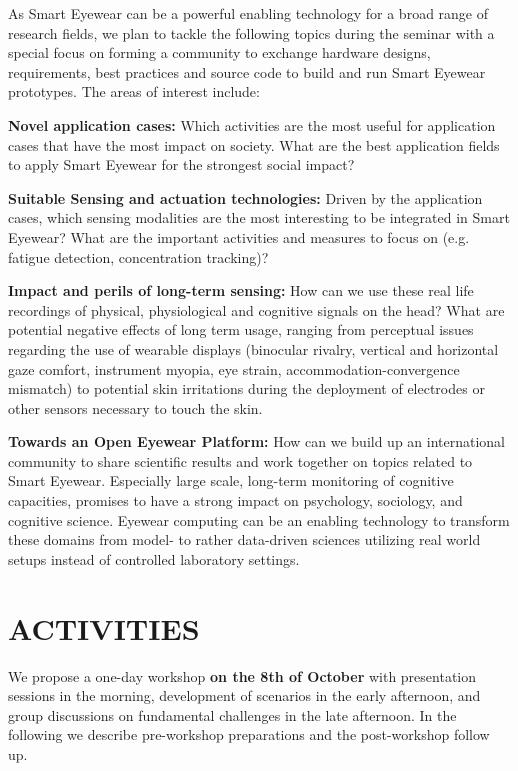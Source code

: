 \documentclass{sigchi-ext}
\begin{document}
As Smart Eyewear can be a powerful enabling technology for a broad range of research fields, we plan to tackle the following topics during the seminar with a special focus on forming a community to exchange hardware designs, requirements, best practices and source code to build and run Smart Eyewear prototypes. The areas of interest include:

 {\bf Novel application cases:} Which activities are the most useful for application cases that have the most impact on society. What are the best application fields to apply Smart Eyewear for the strongest social impact?
 
{\bf Suitable Sensing and actuation technologies:} Driven by the application cases, which sensing modalities are the most interesting to be integrated in Smart Eyewear? What are the important activities and measures to focus on (e.g. fatigue detection, concentration tracking)? 

 {\bf Impact and perils of long-term sensing:} How can we use these real life recordings of physical, physiological and cognitive signals on the head? What are potential negative effects of long term usage, ranging from perceptual issues regarding the use of wearable displays (binocular rivalry, vertical and horizontal gaze comfort, instrument myopia, eye strain, accommodation-convergence mismatch) to potential skin irritations during the deployment of electrodes or other sensors necessary to touch the skin. 

{\bf Towards an Open Eyewear Platform:} How can we build up an international community to share scientific results and work together on topics related to Smart Eyewear. Especially large scale, long-term monitoring of cognitive capacities, promises to have a strong impact on psychology, sociology, and cognitive science. Eyewear computing can be an enabling technology to transform these domains from model- to rather data-driven sciences utilizing real world setups instead of controlled laboratory settings.

\section{ACTIVITIES}
We propose a one-day workshop {\bf on the 8th of October} with presentation sessions in the morning, development of scenarios in the early afternoon, and group discussions on fundamental challenges in the late afternoon. In the following we describe pre-workshop preparations and the post-workshop follow up.
\end{document}
